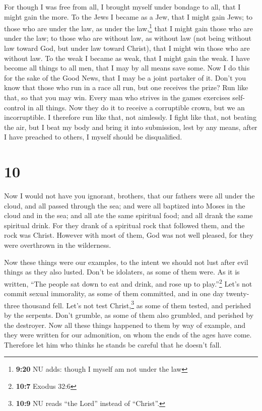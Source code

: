  For though I was free from all, I brought myself under
bondage to all, that I might gain the more.  To the Jews
I became as a Jew, that I might gain Jews; to those who are under the
law, as under the law,\footnote{\textbf{9:20} NU adds: though I myself
  am not under the law} that I might gain those who are under the law;
 to those who are without law, as without law (not being
without law toward God, but under law toward Christ), that I might win
those who are without law.  To the weak I became as weak,
that I might gain the weak. I have become all things to all men, that I
may by all means save some.  Now I do this for the sake
of the Good News, that I may be a joint partaker of it. 
Don't you know that those who run in a race all run, but one receives
the prize? Run like that, so that you may win.  Every man
who strives in the games exercises self-control in all things. Now they
do it to receive a corruptible crown, but we an incorruptible.
 I therefore run like that, not aimlessly. I fight like
that, not beating the air,  but I beat my body and bring
it into submission, lest by any means, after I have preached to others,
I myself should be disqualified.

\hypertarget{section-9}{%
\section{10}\label{section-9}}

 Now I would not have you ignorant, brothers, that our
fathers were all under the cloud, and all passed through the sea;
 and were all baptized into Moses in the cloud and in the
sea;  and all ate the same spiritual food; 
and all drank the same spiritual drink. For they drank of a spiritual
rock that followed them, and the rock was Christ.  However
with most of them, God was not well pleased, for they were overthrown in
the wilderness.

 Now these things were our examples, to the intent we
should not lust after evil things as they also lusted. 
Don't be idolaters, as some of them were. As it is written, ``The people
sat down to eat and drink, and rose up to play.''\footnote{\textbf{10:7}
  Exodus 32:6}  Let's not commit sexual immorality, as
some of them committed, and in one day twenty-three thousand fell.
 Let's not test Christ,\footnote{\textbf{10:9} NU reads
  ``the Lord'' instead of ``Christ''.} as some of them tested, and
perished by the serpents.  Don't grumble, as some of them
also grumbled, and perished by the destroyer.  Now all
these things happened to them by way of example, and they were written
for our admonition, on whom the ends of the ages have come.
 Therefore let him who thinks he stands be careful that
he doesn't fall.

